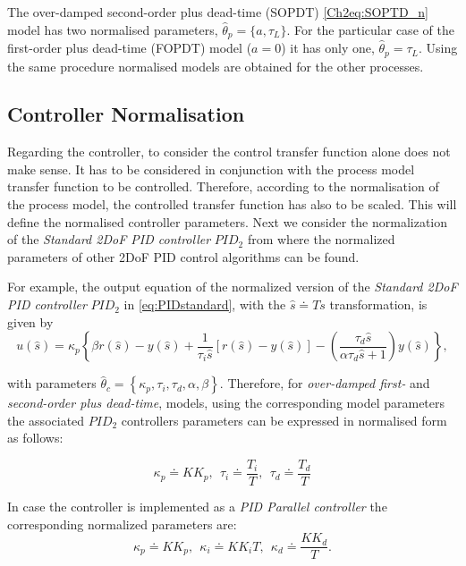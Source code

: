 The over-damped second-order plus dead-time (SOPDT) \eqref{Ch2eq:SOPTD_n} model has two normalised parameters, $\hat{\theta}_p = \{a, \tau_L\}$.  For the particular case of the first-order plus dead-time (FOPDT) model ($a=0$) it has only one, $\hat{\theta}_p = \tau_L$. Using the same procedure normalised models are obtained for the other processes.\\


\subsection{Controller Normalisation}
\label{sec:4.2}

Regarding the controller, to consider the control transfer function alone does not make sense. It has to be considered in conjunction with the process model transfer function to be controlled. Therefore, according to the normalisation of the process model, the controlled transfer function has also to be scaled. This will define the normalised controller parameters. Next we consider the normalization of the \emph{Standard 2DoF PID controller} $PID_2$ from where the normalized parameters of other 2DoF PID control algorithms can be found.

For example, the output equation of the normalized version of the \emph{Standard 2DoF PID controller} $PID_2$ in \eqref{eq:PIDstandard}, with the $\hat s \doteq T s$ transformation, is given by
\begin{equation}
	u(\hat s) = \kappa_p \left\{\beta r(\hat s)-y(\hat s) + \frac{1}{\tau_i \hat s} \left[r(\hat s)-y(\hat s)\right] - \left(\frac{\tau_d \hat s}{\alpha \tau_d \hat s+1}\right) y(\hat s)\right\},
\end{equation}

\noindent with parameters $\hat{\theta}_c = \left\{\kappa_p, \tau_i, \tau_d, \alpha, \beta \right\}$. Therefore,  for \emph{over-damped first-} and \emph{second-order plus dead-time},  models, using the corresponding model parameters the associated $PID_2$ controllers parameters can be expressed in normalised form as follows:

\begin{equation}
	\kappa_p \doteq K K_p, \ \ \tau_i \doteq \frac{T_i}{T}, \ \ \tau_d \doteq \frac{T_d}{T} 
	\label{Ch2eq:PIDNormalized}
\end{equation}

In case the controller is implemented as a \emph{PID Parallel controller} the corresponding normalized parameters are:
\begin{equation}
	\kappa_p \doteq K K_p, \ \ \kappa_i \doteq K K_i T, \ \ \kappa_d \doteq \frac{K K_d}{T}.	
\end{equation}


